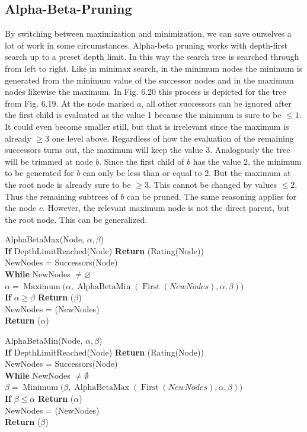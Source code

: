 \documentclass[10pt]{book}
\begin{document}
\subsection{Alpha-Beta-Pruning}
By switching between maximization and minimization, we can save ourselves a lot of work in some circumstances. Alpha-beta pruning works with depth-first search up to a preset depth limit. In this way the search tree is searched through from left to right. Like in minimax search, in the minimum nodes the minimum is generated from the minimum value of the successor nodes and in the maximum nodes likewise the maximum. In Fig. 6.20 this process is depicted for the tree from Fig. 6.19. At the node marked $a$, all other successors can be ignored after the first child is evaluated as the value 1 because the minimum is sure to be $\leq 1$. It could even become smaller still, but that is irrelevant since the maximum is already $\geq 3$ one level above. Regardless of how the evaluation of the remaining successors turns out, the maximum will keep the value 3. Analogously the tree will be trimmed at node $b$. Since the first child of $b$ has the value 2, the minimum to be generated for $b$ can only be less than or equal to 2. But the maximum at the root node is already sure to be $\geq 3$. This cannot be changed by values $\leq 2$. Thus the remaining subtrees of $b$ can be pruned.
The same reasoning applies for the node $c$. However, the relevant maximum node is not the direct parent, but the root node. This can be generalized.

AlphaBetaMax(Node, $\alpha, \beta$)\\
\textbf{If} DepthLimitReached(Node) \textbf{Return} (Rating(Node))\\
NewNodes = Successors(Node)\\
\textbf{While} NewNodes $\neq \varnothing$\\
\quad $\alpha = \operatorname{Maximum}\bigl(\alpha, \operatorname{AlphaBetaMin}(\operatorname{First}(NewNodes), \alpha, \beta)\bigr)$\\
\quad \textbf{If} $\alpha \geq \beta$ \textbf{Return} ($\beta$)\\
\quad NewNodes = (NewNodes)\\
\textbf{Return} ($\alpha$)

AlphaBetaMin(Node, $\alpha, \beta$)\\
\textbf{If} DepthLimitReached(Node) \textbf{Return} (Rating(Node))\\
NewNodes = Successors(Node)\\
\textbf{While} NewNodes $\neq \emptyset$\\
\quad $\beta = \operatorname{Minimum}\bigl(\beta, \operatorname{AlphaBetaMax}(\operatorname{First}(NewNodes), \alpha, \beta)\bigr)$\\
\quad \textbf{If} $\beta \leq \alpha$ \textbf{Return} ($\alpha$)\\
\quad NewNodes = (NewNodes)\\
\textbf{Return} ($\beta$)
\end{document}
